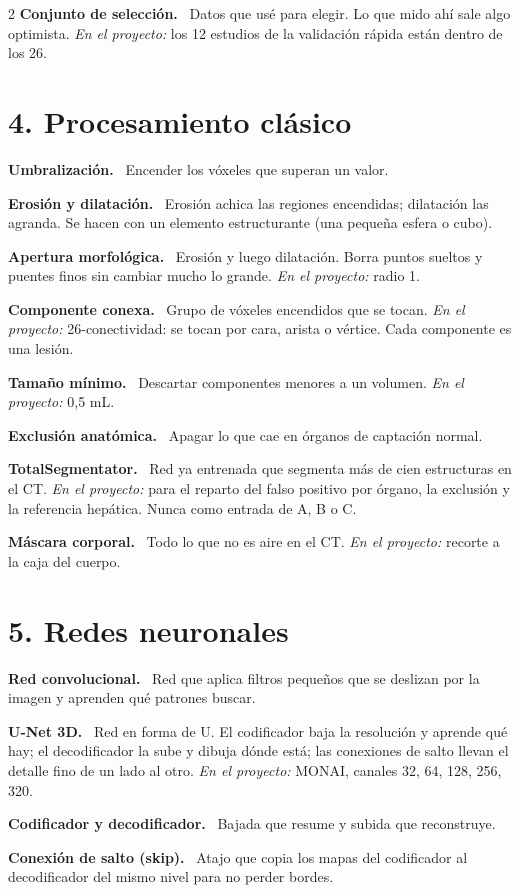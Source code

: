 \documentclass[9pt,a4paper]{extarticle}
\newcommand{\T}[1]{{\sffamily\bfseries\color{tinta}#1.}\ }
\newcommand{\aqui}[1]{{\color{acento}\itshape En el proyecto:} #1}
\begin{document}
\begin{multicols}{2}
\T{Conjunto de selección} Datos que usé para elegir. Lo que mido ahí sale algo optimista. \aqui{los 12 estudios de la validación rápida están dentro de los 26.}

\section{4. Procesamiento clásico}

\T{Umbralización} Encender los vóxeles que superan un valor.

\T{Erosión y dilatación} Erosión achica las regiones encendidas; dilatación las agranda. Se hacen con un elemento estructurante (una pequeña esfera o cubo).

\T{Apertura morfológica} Erosión y luego dilatación. Borra puntos sueltos y puentes finos sin cambiar mucho lo grande. \aqui{radio 1.}

\T{Componente conexa} Grupo de vóxeles encendidos que se tocan. \aqui{26-conectividad: se tocan por cara, arista o vértice. Cada componente es una lesión.}

\T{Tamaño mínimo} Descartar componentes menores a un volumen. \aqui{0,5 mL.}

\T{Exclusión anatómica} Apagar lo que cae en órganos de captación normal.

\T{TotalSegmentator} Red ya entrenada que segmenta más de cien estructuras en el CT. \aqui{para el reparto del falso positivo por órgano, la exclusión y la referencia hepática. Nunca como entrada de A, B o C.}

\T{Máscara corporal} Todo lo que no es aire en el CT. \aqui{recorte a la caja del cuerpo.}

\section{5. Redes neuronales}

\T{Red convolucional} Red que aplica filtros pequeños que se deslizan por la imagen y aprenden qué patrones buscar.

\T{U-Net 3D} Red en forma de U. El codificador baja la resolución y aprende qué hay; el decodificador la sube y dibuja dónde está; las conexiones de salto llevan el detalle fino de un lado al otro. \aqui{MONAI, canales 32, 64, 128, 256, 320.}

\T{Codificador y decodificador} Bajada que resume y subida que reconstruye.

\T{Conexión de salto (skip)} Atajo que copia los mapas del codificador al decodificador del mismo nivel para no perder bordes.


\end{multicols}
\end{document}
